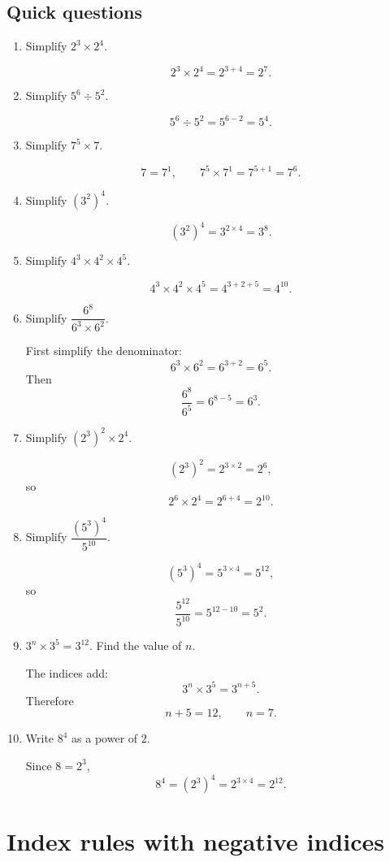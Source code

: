 \documentclass[11pt]{article}
\begin{document}
\subsection*{Quick questions}
\begin{enumerate}
\item Simplify $2^3\times2^4$.

\[
2^3\times2^4=2^{3+4}=2^7.
\]

\item Simplify $5^6\div5^2$.

\[
5^6\div5^2=5^{6-2}=5^4.
\]

\item Simplify $7^5\times7$.

\[
7=7^1,\qquad 7^5\times7^1=7^{5+1}=7^6.
\]

\item Simplify $\left(3^2\right)^4$.

\[
\left(3^2\right)^4=3^{2\times4}=3^8.
\]

\item Simplify $4^3\times4^2\times4^5$.

\[
4^3\times4^2\times4^5=4^{3+2+5}=4^{10}.
\]

\item Simplify $\dfrac{6^8}{6^3\times6^2}$.

First simplify the denominator:
\[
6^3\times6^2=6^{3+2}=6^5.
\]
Then
\[
\frac{6^8}{6^5}=6^{8-5}=6^3.
\]

\item Simplify $\left(2^3\right)^2\times2^4$.

\[
\left(2^3\right)^2=2^{3\times2}=2^6,
\]
so
\[
2^6\times2^4=2^{6+4}=2^{10}.
\]

\item Simplify $\dfrac{\left(5^3\right)^4}{5^{10}}$.

\[
\left(5^3\right)^4=5^{3\times4}=5^{12},
\]
so
\[
\frac{5^{12}}{5^{10}}=5^{12-10}=5^2.
\]

\item $3^n\times3^5=3^{12}$. Find the value of $n$.

The indices add:
\[
3^n\times3^5=3^{n+5}.
\]
Therefore
\[
n+5=12,\qquad n=7.
\]

\item Write $8^4$ as a power of $2$.

Since $8=2^3$,
\[
8^4=\left(2^3\right)^4=2^{3\times4}=2^{12}.
\]
\end{enumerate}

\section{Index rules with negative indices}
\end{document}
